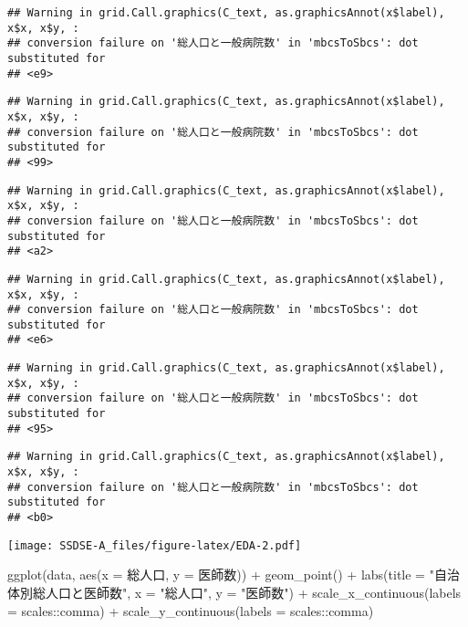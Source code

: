 \documentclass[
]{article}
\newenvironment{Shaded}{\begin{snugshade}}{\end{snugshade}}
\newcommand{\AttributeTok}[1]{\textcolor[rgb]{0.77,0.63,0.00}{#1}}
\newcommand{\FunctionTok}[1]{\textcolor[rgb]{0.00,0.00,0.00}{#1}}
\newcommand{\NormalTok}[1]{#1}
\newcommand{\SpecialCharTok}[1]{\textcolor[rgb]{0.00,0.00,0.00}{#1}}
\newcommand{\StringTok}[1]{\textcolor[rgb]{0.31,0.60,0.02}{#1}}
\begin{document}
\begin{verbatim}
## Warning in grid.Call.graphics(C_text, as.graphicsAnnot(x$label), x$x, x$y, :
## conversion failure on '総人口と一般病院数' in 'mbcsToSbcs': dot substituted for
## <e9>
\end{verbatim}

\begin{verbatim}
## Warning in grid.Call.graphics(C_text, as.graphicsAnnot(x$label), x$x, x$y, :
## conversion failure on '総人口と一般病院数' in 'mbcsToSbcs': dot substituted for
## <99>
\end{verbatim}

\begin{verbatim}
## Warning in grid.Call.graphics(C_text, as.graphicsAnnot(x$label), x$x, x$y, :
## conversion failure on '総人口と一般病院数' in 'mbcsToSbcs': dot substituted for
## <a2>
\end{verbatim}

\begin{verbatim}
## Warning in grid.Call.graphics(C_text, as.graphicsAnnot(x$label), x$x, x$y, :
## conversion failure on '総人口と一般病院数' in 'mbcsToSbcs': dot substituted for
## <e6>
\end{verbatim}

\begin{verbatim}
## Warning in grid.Call.graphics(C_text, as.graphicsAnnot(x$label), x$x, x$y, :
## conversion failure on '総人口と一般病院数' in 'mbcsToSbcs': dot substituted for
## <95>
\end{verbatim}

\begin{verbatim}
## Warning in grid.Call.graphics(C_text, as.graphicsAnnot(x$label), x$x, x$y, :
## conversion failure on '総人口と一般病院数' in 'mbcsToSbcs': dot substituted for
## <b0>
\end{verbatim}

\texttt{[image: SSDSE-A\_files/figure-latex/EDA-2.pdf]}

\begin{Shaded}
\begin{Highlighting}[]
\FunctionTok{ggplot}\NormalTok{(data, }\FunctionTok{aes}\NormalTok{(}\AttributeTok{x =}\NormalTok{ 総人口, }\AttributeTok{y =}\NormalTok{ 医師数)) }\SpecialCharTok{+} \FunctionTok{geom\_point}\NormalTok{() }\SpecialCharTok{+} 
  \FunctionTok{labs}\NormalTok{(}\AttributeTok{title =} \StringTok{"自治体別総人口と医師数"}\NormalTok{, }\AttributeTok{x =} \StringTok{"総人口"}\NormalTok{, }\AttributeTok{y =} \StringTok{"医師数"}\NormalTok{) }\SpecialCharTok{+}
  \FunctionTok{scale\_x\_continuous}\NormalTok{(}\AttributeTok{labels =}\NormalTok{ scales}\SpecialCharTok{::}\NormalTok{comma) }\SpecialCharTok{+}
  \FunctionTok{scale\_y\_continuous}\NormalTok{(}\AttributeTok{labels =}\NormalTok{ scales}\SpecialCharTok{::}\NormalTok{comma)}
\end{Highlighting}
\end{Shaded}
\end{document}
